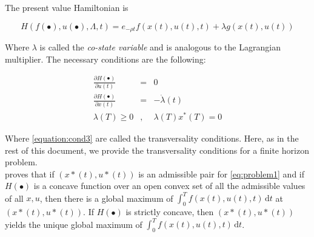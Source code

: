 The present value Hamiltonian is

\begin{equation}
H(f(\bullet), u(\bullet), \Lambda, t) = e_{- \rho t} f(x(t), u(t),t) + \lambda g(x(t),u(t))
\end{equation}

Where $\lambda$ is called the \textit{co-state variable} and is analogous to the Lagrangian multiplier. The necessary conditions are the following:

\begin{eqnarray}
\frac{\partial H(\bullet)}{\partial u(t)} &=& 0 \label{equation:cond1} \\ 
\frac{\partial H(\bullet)}{\partial x(t)} &=& -\dot{\lambda}(t) \label{equation:cond2} \\
\lambda (T) \geq 0 &,& \lambda (T) x^*(T) = 0 \label{equation:cond3}
\end{eqnarray}

Where \eqref{equation:cond3} are called the transversality conditions. Here, as in the rest of this document, we provide the transversality conditions for a finite horizon problem. \\

\citep {mangasarian1966sufficient} proves that if $(x*(t),u*(t))$ is an admissible pair for \eqref{eq:problem1} and if $ H(\bullet)$  is a concave function over an open convex set of all the admissible values of  all $x, u$, then there is a global maximum of $ \int_0^T \! f(x(t),u(t),t) \, \mathrm{d}t$ at $(x*(t),u*(t))$. If $ H(\bullet)$ is strictly concave, then $(x*(t),u*(t))$  yields the unique global maximum of  $ \int_0^T \! f(x(t),u(t),t) \, \mathrm{d}t$.

